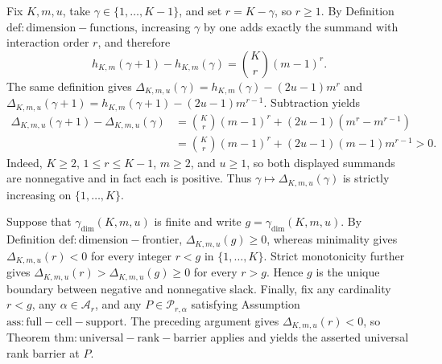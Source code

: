 Fix \(K,m,u\), take \(\gamma\in\{1,\ldots,K-1\}\), and set \(r=K-\gamma\), so \(r\ge 1\). By Definition \(\mathrm{def:dimension-functions}\), increasing \(\gamma\) by one adds exactly the summand with interaction order \(r\), and therefore
\[h_{K,m}(\gamma+1)-h_{K,m}(\gamma)=\binom{K}{r}(m-1)^r.\]
The same definition gives \(\Delta_{K,m,u}(\gamma)=h_{K,m}(\gamma)-(2u-1)m^r\) and \(\Delta_{K,m,u}(\gamma+1)=h_{K,m}(\gamma+1)-(2u-1)m^{r-1}\). Subtraction yields
\[\begin{aligned}\Delta_{K,m,u}(\gamma+1)-\Delta_{K,m,u}(\gamma)&=\binom{K}{r}(m-1)^r+(2u-1)(m^r-m^{r-1})\\&=\binom{K}{r}(m-1)^r+(2u-1)(m-1)m^{r-1}>0.\end{aligned}\]
Indeed, \(K\ge2\), \(1\le r\le K-1\), \(m\ge2\), and \(u\ge1\), so both displayed summands are nonnegative and in fact each is positive. Thus \(\gamma\mapsto\Delta_{K,m,u}(\gamma)\) is strictly increasing on \(\{1,\ldots,K\}\).

Suppose that \(\gamma_{\mathrm{dim}}(K,m,u)\) is finite and write \(g=\gamma_{\mathrm{dim}}(K,m,u)\). By Definition \(\mathrm{def:dimension-frontier}\), \(\Delta_{K,m,u}(g)\ge0\), whereas minimality gives \(\Delta_{K,m,u}(r)<0\) for every integer \(r<g\) in \(\{1,\ldots,K\}\). Strict monotonicity further gives \(\Delta_{K,m,u}(r)>\Delta_{K,m,u}(g)\ge0\) for every \(r>g\). Hence \(g\) is the unique boundary between negative and nonnegative slack. Finally, fix any cardinality \(r<g\), any \(\alpha\in\mathcal A_r\), and any \(P\in\mathcal P_{r,\alpha}\) satisfying Assumption \(\mathrm{ass:full-cell-support}\). The preceding argument gives \(\Delta_{K,m,u}(r)<0\), so Theorem \(\mathrm{thm:universal-rank-barrier}\) applies and yields the asserted universal rank barrier at \(P\).